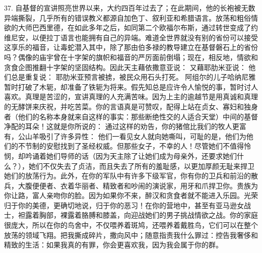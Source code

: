 37. 自基督的宣讲照亮世界以来，大约四百年过去了；在此期间，他的长袍被无数异端撕裂，几乎所有的错误教义都源自加色丁、叙利亚和希腊语言。放荡和粗俗情欲的大师巴西里德，在如此多年之后，如同第二个欧福尔布斯，通过转世变成了约维尼安，以便拉丁语言也能拥有自己的异端。难道全世界就没有别的省份可以接受这享乐的福音，让毒蛇潜入其中，除了那由伯多禄的教导建立在基督磐石上的省份吗？偶像的庙宇曾在十字架的旗帜和福音的严厉面前倒塌；现在，相反地，情欲和贪食企图推翻十字架的坚固结构。因此天主藉依撒意亚说：  又藉耶肋米亚说： 他们总是重复说：  耶肋米亚预言被掳，被民众用石头打死。 阿组尔的儿子哈纳尼雅暂时打破了木轭，却准备了铁轭为将来。假先知总是应许令人愉悦的事，暂时讨人喜欢。真理是苦涩的，宣讲真理的人充满苦味。因为上主的逾越节是用真诚和真理的无酵饼来庆祝，并吃苦菜。你的言语真是可赞叹，配得上站在贞女、寡妇和独身者（他们的名称本身就来自这样的事实：那些断绝性交的人适合天堂）中间的基督净配的耳朵！这就是你所说的： 通过这样的劝告，你的猪倌比我们的牧人更富有，公山羊吸引了许多异性：  他们一看见女人就向她嘶叫，可耻的是，他们为他们的不节制的安慰找到了圣经权威。但那些女子，不幸的人！尽管她们不值得怜悯，却吟诵着她们导师的话（因为天主除了让她们成为母亲外，还要求她们什么？），她们不仅失去了贞洁，而且失去了所有的羞耻感，以更加厚颜无耻来捍卫她们的放荡行为。此外，在你的军队中有许多下级军官，你有你的卫兵和前沿的散兵，大腹便便者、衣着华丽者、精致者和吵闹的演说家，用牙和爪捍卫你。贵族为你让路，富人亲吻你的脸。因为如果你不来，醉汉和贪食者就不能进入乐园。光荣归于你的美德，更确切地说，归于你的恶习！在你的营地中，甚至有亚马逊女战士，袒露着胸部，裸露着胳膊和膝盖，向迎战她们的男子挑战情欲之战。你的家庭很庞大，所以在你的鸟舍中，不仅喂养着斑鸠，还喂养着戴胜鸟，它们可以在整个放荡的领域飞翔。把我撕成碎片，撒向风中；随意指责我什么罪过：控告我奢侈和精致的生活：如果我真的有罪，你会更喜欢我，因为我会属于你的群。\par

